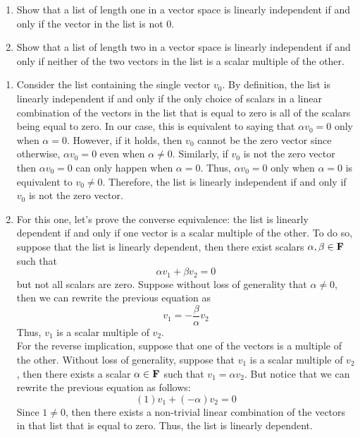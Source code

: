 \begin{exercise}
    \begin{enumerate}[label=(\alph*)]
        \item Show that a list of length one in a vector space is linearly independent if and only if the vector in the list is not 0.
        \item Show that a list of length two in a vector space is linearly independent if and only if neither of the two vectors in the list is a scalar multiple of the other. \\
    \end{enumerate}
\end{exercise}

\begin{solution}
    \begin{enumerate}[label=(\alph*)]
        \item Consider the list containing the single vector $v_0$. By definition, the list is linearly independent if and only if the only choice of scalars in a linear combination of the vectors in the list that is equal to zero is all of the scalars being equal to zero. In our case, this is equivalent to saying that $\alpha v_0 = 0$ only when $\alpha = 0$. However, if it holds, then $v_0$ cannot be the zero vector since otherwise, $\alpha v_0 = 0$ even when $\alpha \neq 0$. Similarly, if $v_0$ is not the zero vector then $\alpha v_0 = 0$ can only happen when $\alpha = 0$. Thus, $\alpha v_0 = 0$ only when $\alpha =0$ is equivalent to $v_0 \neq 0$. Therefore, the list is linearly independent if and only if $v_0$ is not the zero vector.
        \item For this one, let's prove the converse equivalence: the list is linearly dependent if and only if one vector is a scalar multiple of the other. To do so, suppose that the list is linearly dependent, then there exist scalars $\alpha, \beta \in \mathbf{F}$ such that 
        $$\alpha v_1 + \beta v_2 = 0$$
        but not all scalars are zero. Suppose without loss of generality that $\alpha \neq 0$, then we can rewrite the previous equation as
        $$v_1 = - \frac{\beta}{\alpha}v_2$$
        Thus, $v_1$ is a scalar multiple of $v_2$. \\
        For the reverse implication, suppose that one of the vectors is a multiple of the other. Without loss of generality, suppose that $v_1$ is a scalar multiple of $v_2$, then there exists a scalar $\alpha \in \mathbf{F}$ such that $v_1 = \alpha v_2$. But notice that we can rewrite the previous equation as follows:
        $$(1)v_1 + (-\alpha)v_2 = 0$$
        Since $1 \neq 0$, then there exists a non-trivial linear combination of the vectors in that list that is equal to zero. Thus, the list is linearly dependent. \\
    \end{enumerate}
\end{solution}

